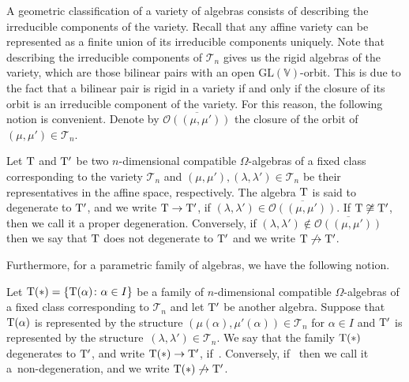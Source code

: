 \documentclass[pdftex]{sigma}
\numberwithin{equation}{section}
\begin{document}
A geometric classification of a variety of algebras consists of describing the irreducible components of the variety. Recall that any affine variety can be represented as a finite union of its irreducible components uniquely.
Note that describing the irreducible components of ${\mathcal{T}_{n}}$ gives us the rigid
algebras of the variety, which are those bilinear pairs with an open $\textrm{GL}(\mathbb V)$-orbit. This %
is due to the fact that a bilinear pair is rigid in a variety if and only if the closure of its orbit is an irreducible component of the variety. %
For this reason, the following notion is convenient. Denote by $\overline{{\mathcal O}((\mu, \mu'))}$ the closure of the orbit of $(\mu, \mu')\in{\mathcal{T}_{n}}$.

\begin{Definition}
Let ${\rm T} $ and ${\rm T}'$ be two $n$-dimensional compatible $\Omega$-algebras of a fixed class corresponding to the variety $\mathcal{T}_{n}$ and $(\mu, \mu'), (\lambda,\lambda') \in \mathcal{T}_{n}$ be their representatives in the affine space, respectively. The algebra ${\rm T}$ is said to {degenerate} to ${\rm T}'$, and we write ${\rm T} \to {\rm T} '$, if $(\lambda,\lambda')\in\overline{{\mathcal O}((\mu, \mu'))}$. If ${\rm T} \not\cong {\rm T}'$, then we call it a {proper degeneration}.
Conversely, if $(\lambda,\lambda')\not\in\overline{{\mathcal O}((\mu, \mu'))}$ then we say that ${{\rm T} }$ does not degenerate to ${{\rm T} }'$
and we write ${{\rm T} }\not\to {{\rm T} }'$.
\end{Definition}

Furthermore, for a parametric family of algebras, we have the following notion.

\begin{Definition}
Let ${{\rm T} }(*)=\{{{\rm T} }(\alpha)\colon {\alpha\in I}\}$ be a family of $n$-dimensional compatible $\Omega$-algebras of a fixed class corresponding to ${\mathcal{T} }_n$ and let ${{\rm T} }'$ be another algebra. Suppose that ${{\rm T} }(\alpha)$ is represented by the structure $(\mu(\alpha),\mu'(\alpha))\in{\mathcal{T} }_n$ for $\alpha\in I$ and ${{\rm T} }'$ is represented by the structure~${(\lambda, \lambda')\in{\mathcal{T} }_n}$. We say that the family ${{\rm T} }(*)$ {degenerates} to ${{\rm T} }'$, and write ${{\rm T} }(*)\to {{\rm T} }'$, if~.
Conversely, if~ then we call it a~{non-degeneration}, and we write ${{\rm T} }(*)\not\to {{\rm T} }'$.
\end{Definition}
\end{document}
